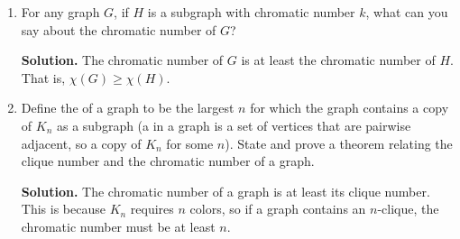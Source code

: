 \documentclass{book}
\begin{document}
\begin{activity}[]
\begin{enumerate}[font=\bfseries,label=(\alph*),ref=\alph*]
\begin{sidebyside}{1}{0.375}{0.375}{0}
\begin{sbspanel}{0.25}
{{
}
}
\end{sbspanel}
\end{sidebyside}
\par\smallskip%
\noindent\textbf{Hint.}\hypertarget{hint-15}{}\quad%
\hypertarget{p-395}{}%
If you find a proper \(5\)-coloring, could the chromatic number be more than \(5\)?  Could it be less than \(5\)?  What if you found a subgraph that you were sure had chromatic number \(5\)?%
~\hfill{\tiny\hyperlink{a-42.a}{[hint]}\hypertarget{q-42.a}{}}\par\smallskip%
\noindent\textbf{Solution.}\hypertarget{solution-39}{}\quad%
\hypertarget{p-396}{}%
There is a proper 5-coloring, so the chromatic number cannot be more than 5.  It also cannot be less than 5, since the graph contains a copy of \(K_5\), which requires 5 colors.  Thus the chromatic number is 5.%
\item\label{task-56} \hypertarget{p-397}{}%
For any graph \(G\), if \(H\) is a subgraph with chromatic number \(k\), what can you say about the chromatic number of \(G\)?%
\par\smallskip%
\noindent\textbf{Solution.}\hypertarget{solution-40}{}\quad%
\hypertarget{p-398}{}%
The chromatic number of \(G\) is at least the chromatic number of \(H\).  That is, \(\chi(G) \ge \chi(H)\).%
\item\label{task-57} \hypertarget{p-399}{}%
Define the  of a graph to be the largest \(n\) for which the graph contains a copy of \(K_n\) as a subgraph (a  in a graph is a set of vertices that are pairwise adjacent, so a copy of \(K_n\) for some \(n\)).  State and prove a theorem relating the clique number and the chromatic number of a graph.%
\par\smallskip%
\noindent\textbf{Solution.}\hypertarget{solution-41}{}\quad%
\hypertarget{p-400}{}%
The chromatic number of a graph is at least its clique number.  This is because \(K_n\) requires \(n\) colors, so if a graph contains an \(n\)-clique, the chromatic number must be at least \(n\).%
\end{enumerate}
\end{activity}
\end{document}
